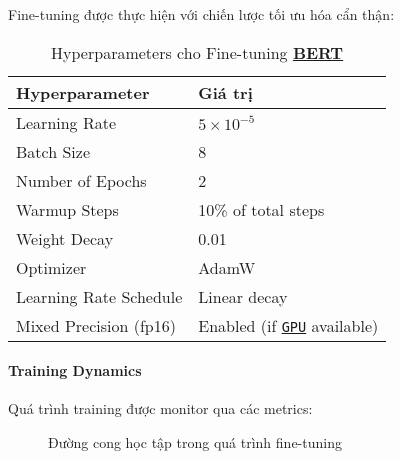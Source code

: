     Fine-tuning được thực hiện với chiến lược tối ưu hóa cẩn thận:
    
    \begin{table}[H]
    \centering
    \caption{Hyperparameters cho Fine-tuning \hyperref[acro:bert]{\textbf{BERT}}}
    \label{tab:finetuning_params}
    \begin{tabular}{ll}
    \toprule
    \textbf{Hyperparameter} & \textbf{Giá trị} \\
    \midrule
    Learning Rate & $5 \times 10^{-5}$ \\
    Batch Size & 8 \\
    Number of Epochs & 2 \\
    Warmup Steps & 10\% of total steps \\
    Weight Decay & 0.01 \\
    Optimizer & AdamW \\
    Learning Rate Schedule & Linear decay \\
    Mixed Precision (fp16) & Enabled (if \hyperref[acro:gpu]{\texttt{GPU}} available) \\
    \bottomrule
    \end{tabular}
    \end{table}
    
    \paragraph{Training
    Dynamics}
    Quá trình training được monitor qua các metrics:
    
    \begin{figure}[H]
    \centering
    \caption{Đường cong học tập trong quá trình fine-tuning}
    \label{fig:training_curves}
    \end{figure}
    
